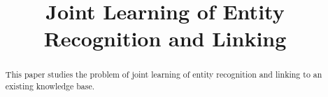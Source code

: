 \documentclass[letterpaper]{article} %
\begin{document}
%
\title{Joint Learning of Entity Recognition and Linking}
\author{}

\maketitle
\begin{abstract}
This paper studies the problem of joint learning of entity recognition and linking to an existing knowledge base.

\end{abstract}

	
	
	
	
	
	
	
	
	
	
\end{document}
